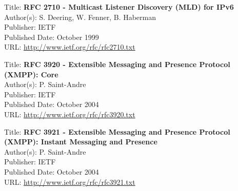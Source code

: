 Title: \textbf{RFC 2710 - Multicast Listener Discovery (MLD) for IPv6} \\ 
Author(s): S. Deering, W. Fenner, B. Haberman \\
Publisher: IETF \\ 
Published Date: October 1999 \\ 
URL: \url{http://www.ietf.org/rfc/rfc2710.txt}   


Title: \textbf{RFC 3920 - Extensible Messaging and Presence Protocol (XMPP): Core} \\ 
Author(s): P. Saint-Andre \\
Publisher: IETF \\ 
Published Date: October 2004 \\ 
URL: \url{http://www.ietf.org/rfc/rfc3920.txt}   


Title: \textbf{RFC 3921 - Extensible Messaging and Presence Protocol (XMPP): Instant Messaging and Presence} \\ 
Author(s): P. Saint-Andre \\
Publisher: IETF \\ 
Published Date: October 2004 \\ 
URL: \url{http://www.ietf.org/rfc/rfc3921.txt}   
